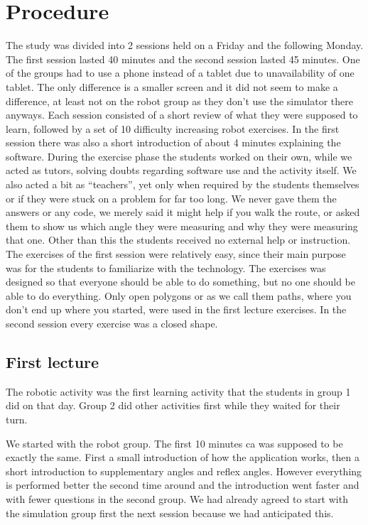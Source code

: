 \chapter{Procedure}
The study was divided into 2 sessions held on a Friday and the following Monday. The first session lasted 40 minutes and the second session lasted 45 minutes. 
One of the groups had to use a phone instead of a tablet due to unavailability of one tablet. 
The only difference is a smaller screen and it did not seem to make a difference, at least not on the robot group as they don't use the simulator there anyways. Each session consisted of a short review of what they were supposed to learn, followed by a set of 10 difficulty increasing robot exercises. In the first session there was also a short introduction of about 4 minutes explaining the software. During the exercise phase the students worked on their own, while we acted as tutors, solving doubts regarding software use and the activity itself. We also acted a bit as "`teachers"', yet only when required by the students themselves or if they were stuck on a problem for far too long. We never gave them the answers or any code, we merely said it might help if you walk the route, or asked them to show us which angle they were measuring and why they were measuring that one. Other than this the students received no external help or instruction. The exercises of the first session were relatively easy, since their main purpose was for the students to familiarize with the technology. The exercises was designed so that everyone should be able to do something, but no one should be able to do everything. Only open polygons or as we call them paths, where you don't end up where you started, were used in the first lecture exercises. In the second session every exercise was a closed shape. 


\section{First lecture}
The robotic activity was the first learning activity that the students in group 1 did on that day. 
Group 2 did other activities first while they waited for their turn.

\bigskip\noindent
We started with the robot group. The first 10 minutes ca was supposed to be exactly the same. First a small introduction of how the application works, then a short introduction to supplementary angles and reflex angles. However everything is performed better the second time around and the introduction went faster and with fewer questions in the second group. We had already agreed to start with the simulation group first the next session because we had anticipated this.

